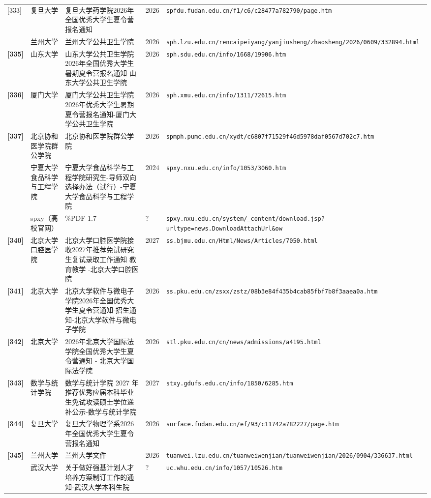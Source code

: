 {\begin{longtable}{@{}p{1.15cm}p{2.9cm}p{6.3cm}p{0.85cm}p{5.0cm}@{}}
[333] & 复旦大学 & 复旦大学药学院2026年全国优秀大学生夏令营报名通知 & 2026 & \texttt{spfdu.fudan.edu.cn/f1/c6/c28477a782790/page.htm} \\
[334] & 兰州大学 & 兰州大学公共卫生学院 & 2026 & \texttt{sph.lzu.edu.cn/rencaipeiyang/yanjiusheng/zhaosheng/2026/0609/332894.html} \\
\textbf{[335]} & 山东大学 & 山东大学公共卫生学院2026年全国优秀大学生暑期夏令营报名通知-山东大学公共卫生学院 & 2026 & \texttt{sph.sdu.edu.cn/info/1668/19906.htm} \\
\textbf{[336]} & 厦门大学 & 厦门大学公共卫生学院2026年优秀大学生暑期夏令营报名通知-厦门大学公共卫生学院 & 2026 & \texttt{sph.xmu.edu.cn/info/1311/72615.htm} \\
\textbf{[337]} & 北京协和医学院群公学院 & 北京协和医学院群公学院 & 2026 & \texttt{spmph.pumc.edu.cn/xydt/c6807f71529f46d5978daf0567d702c7.htm} \\
[338] & 宁夏大学食品科学与工程学院 & 宁夏大学食品科学与工程学院研究生-导师双向选择办法（试行）-宁夏大学食品科学与工程学院 & 2024 & \texttt{spxy.nxu.edu.cn/info/1053/3060.htm} \\
[339] & spxy（高校官网） & \%PDF-1.7 & ? & \texttt{spxy.nxu.edu.cn/system/\_content/download.jsp?urltype=news.DownloadAttachUrl\&ow} \\
\textbf{[340]} & 北京大学口腔医学院 & 北京大学口腔医学院接收2027年推荐免试研究生复试录取工作通知 教育教学 -北京大学口腔医院 & 2027 & \texttt{ss.bjmu.edu.cn/Html/News/Articles/7050.html} \\
\textbf{[341]} & 北京大学 & 北京大学软件与微电子学院2026年全国优秀大学生夏令营通知-招生通知-北京大学软件与微电子学院 & 2026 & \texttt{ss.pku.edu.cn/zsxx/zstz/08b3e84f435b4cab85fbf7b8f3aaea0a.htm} \\
\textbf{[342]} & 北京大学 & 2026年北京大学国际法学院全国优秀大学生夏令营通知 - 北京大学国际法学院 & 2026 & \texttt{stl.pku.edu.cn/cn/news/admissions/a4195.html} \\
\textbf{[343]} & 数学与统计学院 & 数学与统计学院 2027 年推荐优秀应届本科毕业生免试攻读硕士学位递补公示-数学与统计学院 & 2027 & \texttt{stxy.gdufs.edu.cn/info/1850/6285.htm} \\
\textbf{[344]} & 复旦大学 & 复旦大学物理学系2026年全国优秀大学生夏令营报名通知 & 2026 & \texttt{surface.fudan.edu.cn/ef/93/c11742a782227/page.htm} \\
\textbf{[345]} & 兰州大学 & 兰州大学文件 & 2026 & \texttt{tuanwei.lzu.edu.cn/tuanweiwenjian/tuanweiwenjian/2026/0904/336637.html} \\
[346] & 武汉大学 & 关于做好强基计划人才培养方案制订工作的通知-武汉大学本科生院 & ? & \texttt{uc.whu.edu.cn/info/1057/10526.htm} \\

\end{longtable}}

